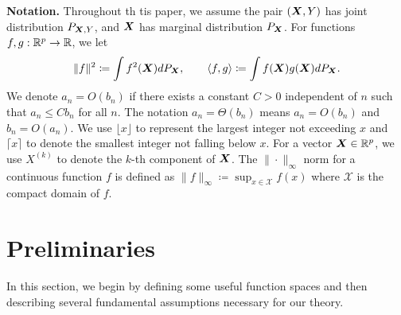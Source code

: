 \noindent\textbf{Notation.} Throughout th tis paper, we assume the pair $(\bm{X},Y)$ has joint distribution $P_{\bm{X},Y}$, and $\bm{X}$ has marginal distribution $P_{\bm{X}}$. For functions $f,g: \mathbb{R}^p \to \mathbb{R}$,  we let
\begin{align*}
    \|f\|^2 \coloneqq \int f^2(\bm{X})dP_{\bm{X}}, \qquad \langle f,g\rangle \coloneqq  \int f(\bm{X})g(\bm{X})dP_{\bm{X}}.
\end{align*}
We denote $a_n = O(b_n)$ if there exists a constant $C>0$ independent of $n$ such that $a_n \leq Cb_n$ for all $n$. The notation $a_n = \Theta(b_n)$ means $a_n = O(b_n)$ and $b_n = O(a_n)$. We use $\lfloor x \rfloor$ to represent the largest integer not exceeding $x$ and $\lceil x \rceil$ to denote the smallest integer not falling below $x$. For a vector $\bm{X} \in \mathbb{R}^p$, we use $X^{(k)}$ to denote the $k$-th component of $\bm{X}$. The $\|\cdot\|_\infty$ norm for a continuous function $f$ is defined as $\|f\|_\infty \coloneqq \sup_{x \in \mathcal{X}}f(x)$ where $\mathcal{X}$ is the compact domain of $f$. 
\section{Preliminaries}\label{sec:pre}

In this section, we begin by defining some useful function spaces and then describing several fundamental assumptions necessary for our theory.

